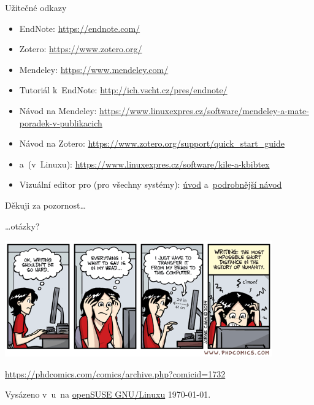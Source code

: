 \documentclass[compress, xelatex, 11pt, xcolor=svgnames, aspectratio=169,
	hyperref={
		bookmarks=true,
		unicode=true,
		colorlinks=true,
		pdftitle={Citacni software},
		plainpages=false,
		pdfauthor={Vojtech Zeisek},
		pdfsubject={Kratky uvod do citacniho software},
		pdfcreator={XeLaTeX},
		pdfkeywords={citace, reference, software, literatura},
		linkcolor=Crimson, %
		anchorcolor=Magenta, %
		citecolor=Magenta, %
		filecolor=Magenta, %
		menucolor=Magenta, %
		urlcolor=DarkTurquoise, %
		},
	url={hyphens, lowtilde} %
	]{beamer}
\begin{document}
\begin{frame}{Užitečné odkazy}
	\begin{itemize}
		\item EndNote: \url{https://endnote.com/}
		\item Zotero: \url{https://www.zotero.org/}
		\item Mendeley: \url{https://www.mendeley.com/}
		\item Tutoriál k~EndNote: \url{http://ich.vscht.cz/pres/endnote/}
		\item Návod na Mendeley: \url{https://www.linuxexpres.cz/software/mendeley-a-mate-poradek-v-publikacich}
		\item Návod na Zotero: \url{https://www.zotero.org/support/quick_start_guide}
		\item \BibTeX{ }a~\XeLaTeX{ }(v~Linuxu): \url{https://www.linuxexpres.cz/software/kile-a-kbibtex}
		\item Vizuální editor pro \XeLaTeX{ }(pro všechny systémy): \href{https://www.linuxexpres.cz/software/textovy-editor-lyx-latex-pro-line}{úvod} a~\href{https://www.linuxexpres.cz/praxe/diplomka-lyx}{podrobnější návod}
	\end{itemize}
\end{frame}

\begin{frame}{Děkuji za pozornost\ldots}
	\begin{Large}
		\begin{flushright}
			\ldots otázky?
		\end{flushright}
	\end{Large}
	\begin{center}
		\includegraphics[height=5cm]{phdcomics_writing.png}
	\end{center}
	\begin{flushright}
		\begin{scriptsize}
			\url{https://phdcomics.com/comics/archive.php?comicid=1732}
		\end{scriptsize}
	\end{flushright}
	\begin{tiny}
		Vysázeno v~\XeLaTeX u~na \href{https://www.opensuse.org/}{openSUSE GNU/Linuxu} \today.
	\end{tiny}
\end{frame}
\end{document}
